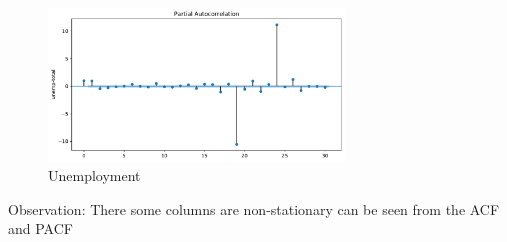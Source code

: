 \begin{figure}[H]
    \centering
    \includegraphics[width=0.7\textwidth]{Images/unemp-total_PAcorr.pdf}
    \caption{Unemployment}
    \label{fig1}
\end{figure}

Observation: There some columns are non-stationary can be seen from the ACF and PACF

